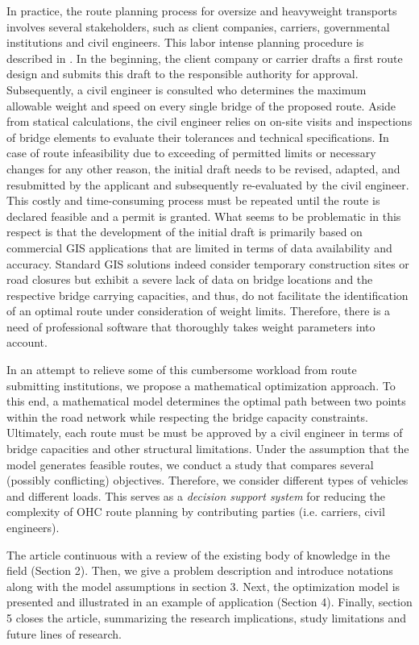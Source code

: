 \par In practice, the route planning process for oversize and heavyweight transports involves several stakeholders, such as client companies, carriers, governmental institutions and civil engineers.
This labor intense planning procedure is described in \cite{Osegueda.1999}. In the beginning, the client company or carrier drafts a first route design and submits this draft to the responsible authority for approval.
Subsequently, a civil engineer is consulted who determines the maximum allowable weight and speed on every single bridge of the proposed route.
Aside from statical calculations, the civil engineer relies on on-site visits and inspections of bridge elements to evaluate their tolerances and technical specifications.
In case of route infeasibility due to exceeding of permitted limits or necessary changes for any other reason, the initial draft needs to be revised, adapted, and resubmitted by the applicant and subsequently re-evaluated by the civil engineer.
This costly and time-consuming process must be repeated until the route is declared feasible and a permit is granted.
What seems to be problematic in this respect is that the development of the initial draft is primarily based on commercial GIS applications that are limited in terms of data availability and accuracy.
Standard GIS solutions indeed consider temporary construction sites or road closures but exhibit a severe lack of data on bridge locations and the respective bridge carrying capacities, and thus, do not facilitate the identification of an optimal route under consideration of weight limits.
Therefore, there is a need of professional software that thoroughly takes weight parameters into account.
\par In an attempt to relieve some of this cumbersome workload from route submitting institutions, we propose a mathematical optimization approach.
To this end, a mathematical model determines the optimal path between two points within the road network while respecting the bridge capacity constraints.
Ultimately, each route must be must be approved by a civil engineer in terms of bridge capacities and other structural limitations. Under the assumption that the model generates feasible routes, we conduct a study that compares several (possibly conflicting) objectives.
Therefore, we consider different types of vehicles and different loads. This serves as a \textit{decision support system} for reducing the complexity of OHC route planning by contributing parties (i.e. carriers, civil engineers).
\par
The article continuous with a review of the existing body of knowledge in the field (Section 2).
Then, we give a problem description and introduce notations along with the model assumptions in section 3. Next, the optimization model is presented and illustrated in an example of application (Section 4).
Finally, section 5 closes the article, summarizing the research implications, study limitations and future lines of research.
